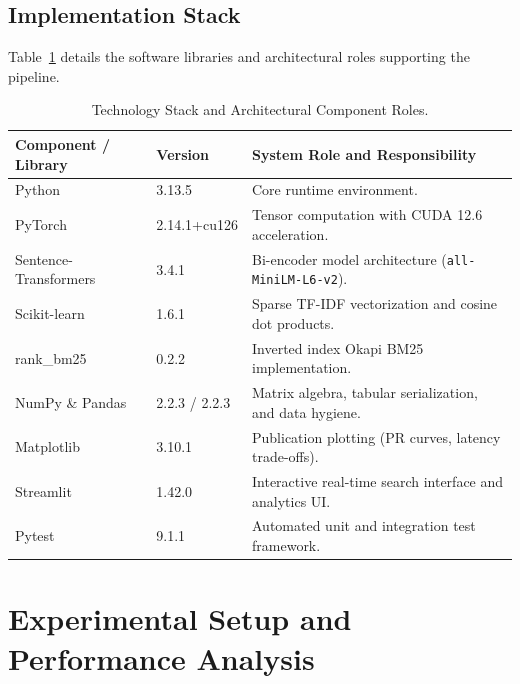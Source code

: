 \documentclass[11pt,a4paper]{article}
\begin{document}
\subsection{Implementation Stack}
Table~\ref{tab:tech_stack} details the software libraries and architectural roles supporting the pipeline.

\begin{table}[h]
\centering
\small
\caption{Technology Stack and Architectural Component Roles.}
\label{tab:tech_stack}
\begin{tabularx}{\textwidth}{llX}
\toprule
\textbf{Component / Library} & \textbf{Version} & \textbf{System Role and Responsibility} \\
\midrule
Python & 3.13.5 & Core runtime environment. \\
PyTorch & 2.14.1+cu126 & Tensor computation with CUDA 12.6 acceleration. \\
Sentence-Transformers & 3.4.1 & Bi-encoder model architecture (\texttt{all-MiniLM-L6-v2}). \\
Scikit-learn & 1.6.1 & Sparse TF-IDF vectorization and cosine dot products. \\
rank\_bm25 & 0.2.2 & Inverted index Okapi BM25 implementation. \\
NumPy \& Pandas & 2.2.3 / 2.2.3 & Matrix algebra, tabular serialization, and data hygiene. \\
Matplotlib & 3.10.1 & Publication plotting (PR curves, latency trade-offs). \\
Streamlit & 1.42.0 & Interactive real-time search interface and analytics UI. \\
Pytest & 9.1.1 & Automated unit and integration test framework. \\
\bottomrule
\end{tabularx}
\end{table}

\newpage

\section{Experimental Setup and Performance Analysis}
\label{sec:experiments}
\end{document}
